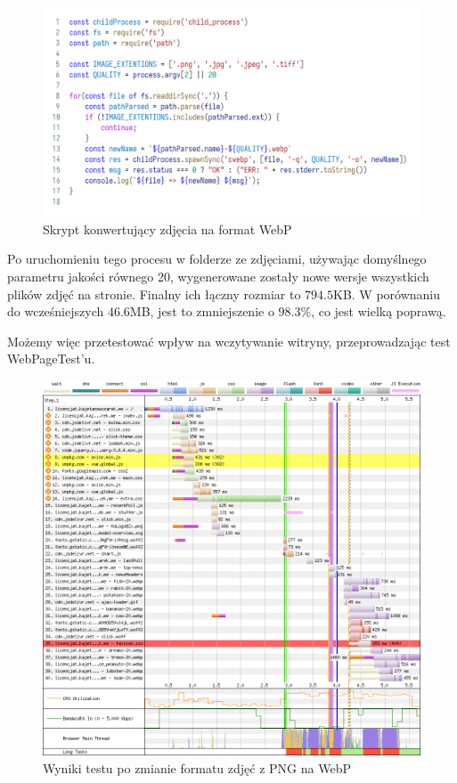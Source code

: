 \documentclass[licencjacka]{pracadypl}
\begin{document}
\begin{figure}[H]
  \includegraphics[width=\linewidth]{images/code_script_conv_webm.png}
  \caption{Skrypt konwertujący zdjęcia na format WebP}
  \label{fig:script-webp}
\end{figure}

Po uruchomieniu tego procesu w folderze ze zdjęciami, używając domyślnego parametru jakości równego 20, wygenerowane zostały nowe wersje wszystkich plików zdjęć na stronie. Finalny ich łączny rozmiar to $794.5$KB. W porównaniu do wcześniejszych $46.6$MB, jest to zmniejszenie o $98.3\%$, co jest wielką poprawą.

Możemy więc przetestować wpływ na wczytywanie witryny, przeprowadzając test WebPageTest'u.

\begin{figure}[H]
  \includegraphics[width=\linewidth]{images/waterfall-after-webp.png}
  \caption{Wyniki testu po zmianie formatu zdjęć z PNG na WebP}
  \label{fig:waterfall-after-webp}
\end{figure}
\end{document}
